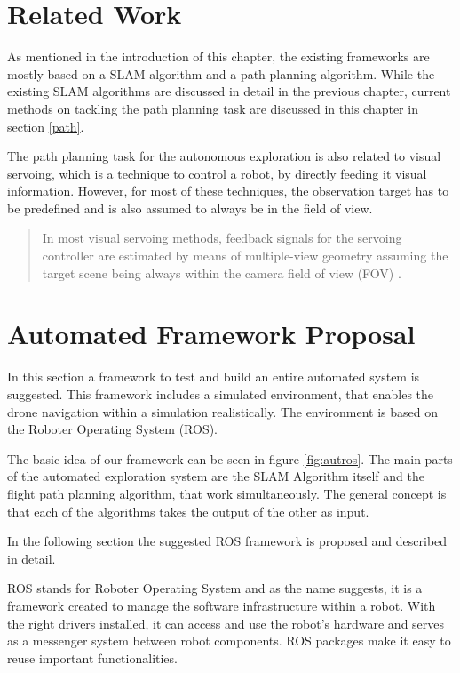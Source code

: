 \section{Related Work}

	As mentioned in the introduction of this chapter, the existing frameworks are mostly based on a SLAM algorithm and a path planning algorithm. While 
	the existing SLAM algorithms are discussed in detail in the previous chapter, current methods on tackling the path planning task are 
	discussed in this chapter in section \ref{path}. 
	
	The path planning task for the autonomous exploration is also related to visual servoing, which is a technique to control a robot, by 
	directly feeding it visual information. However, for most of these techniques, the observation target has to be predefined and is also assumed 
	to always be in the field of view. 
	
	\begin{quote}
	
	In most visual servoing methods, feedback signals for the servoing
	controller are estimated by means of multiple-view geometry assuming 
	the target scene being always within the camera field of view (FOV) \cite{servo}.
	
	\end{quote}
	
\section{Automated Framework Proposal} \label{rosframe}
	
	In this section a framework to test and build an entire automated system is suggested. This framework includes a 
	simulated environment, that enables the drone navigation within a simulation realistically. The environment 
	is based on the Roboter Operating System (ROS).
	
	The basic idea of our framework can be seen in figure \ref{fig:autros}. The main parts of the automated exploration system are the SLAM Algorithm itself
	and the flight path planning algorithm, that work simultaneously. The general concept is that each of the algorithms takes the output of the other as 
	input. 
	
	In the following section the suggested ROS framework is proposed and described in detail. 
		
	ROS stands for Roboter Operating System and as the name suggests, it is a framework created to manage the software infrastructure within a robot. With the right drivers installed, 
	it can access and use the robot's hardware and serves as a messenger system between robot components. ROS packages make it easy to 
	reuse important functionalities.

